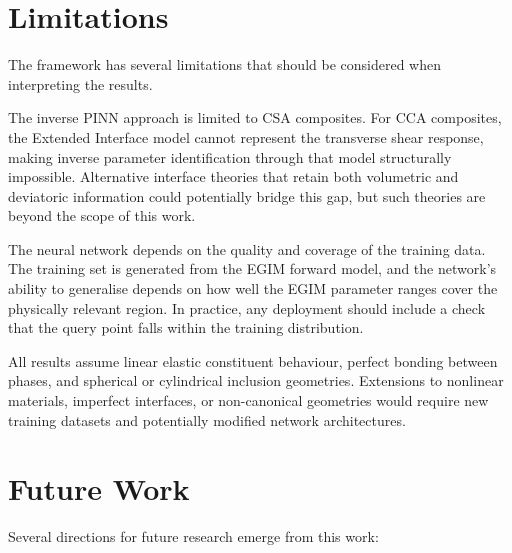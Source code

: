 \documentclass[oneside, 12pt, a4paper, bibliography=totoc]{book}
\begin{document}
\section{Limitations}

The framework has several limitations that should be considered when interpreting the results.

The inverse PINN approach is limited to CSA composites. For CCA composites, the Extended Interface model cannot represent the transverse shear response, making inverse parameter identification through that model structurally impossible. Alternative interface theories that retain both volumetric and deviatoric information could potentially bridge this gap, but such theories are beyond the scope of this work.

The neural network depends on the quality and coverage of the training data. The training set is generated from the EGIM forward model, and the network's ability to generalise depends on how well the EGIM parameter ranges cover the physically relevant region. In practice, any deployment should include a check that the query point falls within the training distribution.

All results assume linear elastic constituent behaviour, perfect bonding between phases, and spherical or cylindrical inclusion geometries. Extensions to nonlinear materials, imperfect interfaces, or non-canonical geometries would require new training datasets and potentially modified network architectures.

\section{Future Work}

Several directions for future research emerge from this work:
\end{document}
